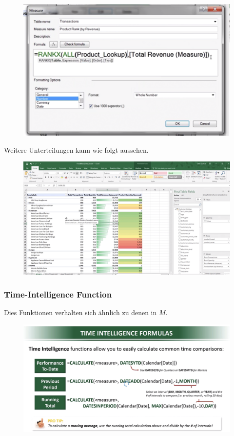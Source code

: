 \begin{figure}[H]
	\centering
	\includegraphics[scale = 0.3]{attachment/chapter_1/screenshot110}
	\caption{}
	\label{fig:screenshot110}
\end{figure} 
Weitere Unterteilungen kann wie folgt aussehen.

\begin{figure}[H]
	\centering
	\includegraphics[scale = 0.3]{attachment/chapter_1/screenshot109}
	\caption{}
	\label{fig:screenshot109}
\end{figure} 

\subsubsection{Time-Intelligence Function}
Dies Funktionen verhalten sich ähnlich zu denen in $M$. 

\begin{figure}[H]
	\centering
	\includegraphics[scale = 0.3]{attachment/chapter_1/screenshot112}
	\caption{}
	\label{fig:screenshot112}
\end{figure} 


